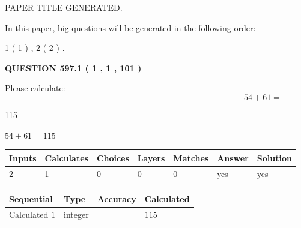 \documentclass[12pt]{article}
\begin{document}
   
 PAPER TITLE GENERATED.
   
   
   
\vspace{0.2in}
   
In this paper, big questions will be generated in the following order: 
   
   
   1 ( 1 )
 ,
   2 ( 2 )
 .
  
\vspace{0.2in}
  
{\textbf{\Large{QUESTION
597.1 
 ( 1 , 1 , 101 )
}}}
  
  
 
Please calculate:
\begin{equation}
54 +  %
61 = \nonumber
\end{equation}
 
 
 
\noindent{}
 
 

115
 
 
\noindent{}
 
 

 
 
 
\noindent{}
 
 

$ %
54 +  %
61=   %
115$
 
 
\noindent{}
 
 

 
   
   
   
   
\noindent\begin{tabular}{|l|l|l|l|l|l|l|}
 \hline
Inputs & Calculates & Choices & Layers & Matches & Answer & Solution \\ \hline
 2  & 
 1  & 
 0
  & 
 0  & 
 0  & 
  yes & 
  yes 
  \\ \hline
 \end{tabular}
   
   
   
   
\noindent{}
   
   
  
  
\noindent\begin{tabular}{|l|l|l|l|}
\hline
 Sequential & Type & Accuracy & Calculated \\ 
\hline
 
 
  Calculated $  1 $ & integer &  & 
  $ 115 $ 
 \\  \hline  
 \end{tabular}
   
\end{document}
